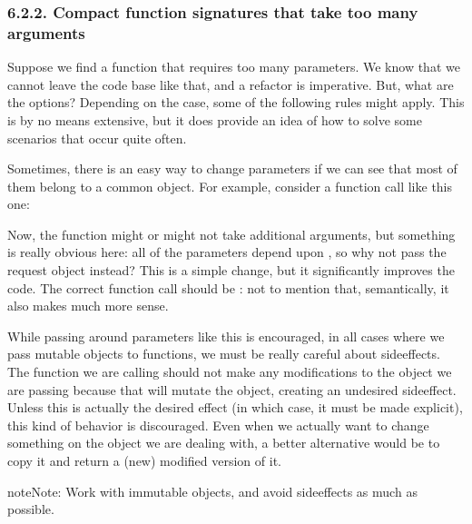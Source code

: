 \documentclass[a4paper,10pt,english]{sphinxmanual}
\begin{document}
\subsubsection{6.2.2. Compact function signatures that take too many arguments}
\label{\detokenize{chapters/3_general_traits/index:compact-function-signatures-that-take-too-many-arguments}}
Suppose we find a function that requires too many parameters. We know that we cannot leave the code base like
that, and a refactor is imperative. But, what are the options? Depending on the case, some of the following
rules might apply. This is by no means extensive, but it does provide an idea of how to solve some scenarios
that occur quite often.

Sometimes, there is an easy way to change parameters if we can see that most of them belong to a common
object. For example, consider a function call like this one:

\begin{sphinxVerbatim}[commandchars=\\\{\}]
  
\end{sphinxVerbatim}

Now, the function might or might not take additional arguments, but something is really obvious here: all of
the parameters depend upon , so why not pass the request object instead? This is a simple change,
but it significantly improves the code. The correct function call should be : not to
mention that, semantically, it also makes much more sense.

While passing around parameters like this is encouraged, in all cases where we pass mutable objects to
functions, we must be really careful about side\sphinxhyphen{}effects. The function we are calling should not make any
modifications to the object we are passing because that will mutate the object, creating an undesired
side\sphinxhyphen{}effect. Unless this is actually the desired effect (in which case, it must be made explicit), this kind
of behavior is discouraged. Even when we actually want to change something on the object we are dealing with,
a better alternative would be to copy it and return a (new) modified version of it.

\begin{sphinxadmonition}{note}{Note:}
Work with immutable objects, and avoid side\sphinxhyphen{}effects as much as possible.
\end{sphinxadmonition}
\end{document}
